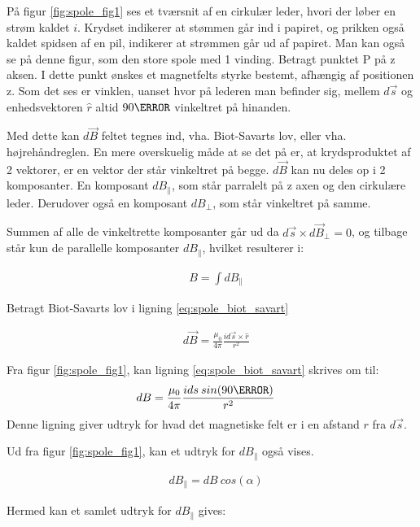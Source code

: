 På figur \ref{fig:spole_fig1} ses et tværsnit af en cirkulær leder, hvori der løber en strøm kaldet $i$. Krydset indikerer at stømmen går ind i papiret, og prikken også kaldet spidsen af en pil, indikerer at strømmen går ud af papiret. Man kan også se på denne figur, som den store spole med 1 vinding. Betragt punktet P på z aksen. I dette punkt ønskes et magnetfelts styrke bestemt, afhængig af positionen z. Som det ses er vinklen, uanset hvor på lederen man befinder sig, mellem $d\vec{s}$ og enhedsvektoren $\hat{r}$ altid $90\degree$ vinkeltret på hinanden.

Med dette kan $d\vec{B}$ feltet tegnes ind, vha. Biot-Savarts lov, eller vha. højrehåndreglen. En mere overskuelig måde at se det på er, at krydsproduktet af 2 vektorer, er en vektor der står vinkeltret på begge. 
$d\vec{B}$ kan nu deles op i 2 komposanter. En komposant $dB_\parallel$, som står parralelt på z axen og den cirkulære leder. Derudover også en komposant $dB_\perp$, som står vinkeltret på samme.

Summen af alle de vinkeltrette komposanter går ud da $d\vec{s}\times d\vec{B}_\perp=0$, og tilbage står kun de parallelle komposanter $dB_\parallel$, hvilket resulterer i:

 \begin{align}
 &B=\int dB_\parallel \label{eq:B_field}
 \end{align}

  
  
Betragt Biot-Savarts lov i ligning \ref{eq:spole_biot_savart}

\begin{align}
&d\vec{B}=\frac{\mu_0}{4\pi} \frac{i d\vec{s} \times \hat{r}}{r^2}\label{eq:spole_biot_savart}
\end{align}

Fra figur \ref{fig:spole_fig1}, kan ligning \ref{eq:spole_biot_savart} skrives om til:
\begin{align}
&dB=\frac{\mu_0}{4\pi} \frac{i ds\: sin(90\degree)}{r^2}\label{eq:spole_biot_savart2}
\end{align}
 Denne ligning giver udtryk for hvad det magnetiske felt er i en afstand $r$ fra $d\vec{s}$.
 
Ud fra figur \ref{fig:spole_fig1}, kan et udtryk for $dB_\parallel$ også vises.

 \begin{align}
 	&dB_\parallel=dB\: cos(\alpha)
 \end{align}

Hermed kan et samlet udtryk for $dB_\parallel$ gives: 

